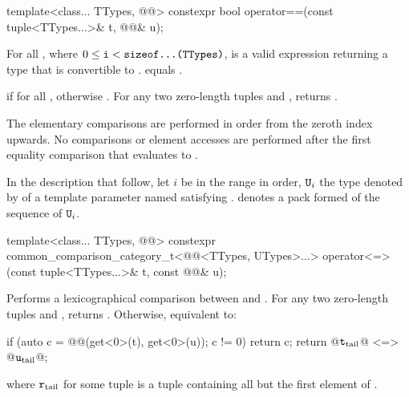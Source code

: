 \documentclass{wg21}
\begin{document}
\begin{itemdecl}
template<class... TTypes, @@>
constexpr bool operator==(const tuple<TTypes...>& t, @@& u);
\end{itemdecl}

\begin{itemdescr}
    \pnum
    \mandates
    For all ,
    where $0 \leq \texttt{i} < \texttt{sizeof...(TTypes)}$,
     is a valid expression
    returning a type that is convertible to .
     equals
    .

    \pnum
    \returns
     if  for all
    , otherwise .
    For any two zero-length tuples  and ,  returns .

    \pnum
    \effects
    The elementary comparisons are performed in order from the zeroth index upwards.  No comparisons or element accesses are
    performed after the first equality comparison that evaluates to
    .
\end{itemdescr}

\begin{addedblock}
In the description that follow, let $i$ be in the range
 in order, $\texttt{U}_i$ {the type denoted by  of a template parameter named  satisfying .  denotes a pack formed of the sequence of $\texttt{U}_i$}.
\end{addedblock}


%
\begin{itemdecl}
template<class... TTypes, @@>
constexpr common_comparison_category_t<@@<TTypes, UTypes>...>
operator<=>(const tuple<TTypes...>& t, const @@& u);
\end{itemdecl}

\begin{itemdescr}
    \pnum
    \effects
    Performs a lexicographical comparison between  and .
    For any two zero-length tuples  and ,
     returns .
    Otherwise, equivalent to:
    \begin{codeblock}
        if (auto c = @@(get<0>(t), get<0>(u)); c != 0) return c;
        return @$\texttt{t}_\mathrm{tail}$@ <=> @$\texttt{u}_\mathrm{tail}$@;
    \end{codeblock}
    where $\texttt{r}_\mathrm{tail}$ for some tuple 
    is a tuple containing all but the first element of .
\end{itemdescr}
\end{document}
